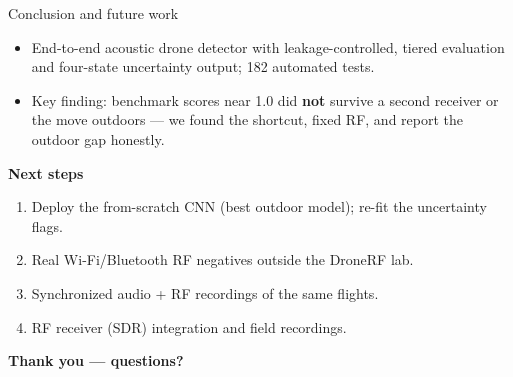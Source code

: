 \documentclass[aspectratio=169,11pt]{beamer}
\begin{document}
\begin{frame}{Conclusion and future work}
\begin{itemize}
  \item End-to-end acoustic drone detector with leakage-controlled, tiered evaluation and
        four-state uncertainty output; 182 automated tests.
  \item Key finding: benchmark scores near 1.0 did \textbf{not} survive a second receiver or the
        move outdoors --- we found the shortcut, fixed RF, and report the outdoor gap honestly.
\end{itemize}
\vspace{4pt}
\textbf{Next steps}
\begin{enumerate}\small
  \item Deploy the from-scratch CNN (best outdoor model); re-fit the uncertainty flags.
  \item Real Wi-Fi/Bluetooth RF negatives outside the DroneRF lab.
  \item Synchronized audio + RF recordings of the same flights.
  \item RF receiver (SDR) integration and field recordings.
\end{enumerate}
\vspace{4pt}
\centering\large\textbf{Thank you --- questions?}
\end{frame}
\end{document}
